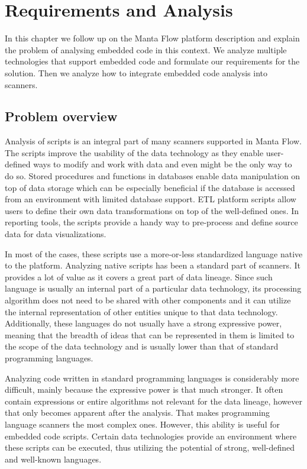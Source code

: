 \chapter{Requirements and Analysis}

In this chapter we follow up on the Manta Flow platform description and explain the problem of analysing embedded code in this context. We analyze multiple technologies that support embedded code and formulate our requirements for the solution. Then we analyze how to integrate embedded code analysis into scanners.

\section{Problem overview}
Analysis of scripts is an integral part of many scanners supported in Manta Flow. The scripts improve the usability of the data technology as they enable user-defined ways to modify and work with data and even might be the only way to do so. Stored procedures and functions in databases enable data manipulation on top of data storage which can be especially beneficial if the database is accessed from an environment with limited database support. ETL platform scripts allow users to define their own data transformations on top of the well-defined ones. In reporting tools, the scripts provide a handy way to pre-process and define source data for data visualizations.
\par %
In most of the cases, these scripts use a more-or-less standardized language native to the platform. Analyzing native scripts has been a standard part of scanners. It provides a lot of value as it covers a great part of data lineage. Since such language is usually an internal part of a particular data technology, its processing algorithm does not need to be shared with other components and it can utilize the internal representation of other entities unique to that data technology. Additionally, these languages do not usually have a strong expressive power, meaning that the breadth of ideas that can be represented in them is limited to the scope of the data technology and is usually  lower than that of standard programming languages.
\par %
Analyzing code written in standard programming languages is considerably more difficult, mainly because the expressive power is that much stronger. It often contain expressions or entire algorithms not relevant for the data lineage, however that only becomes apparent after the analysis. That makes programming language scanners the most complex ones. However, this ability is useful for embedded code scripts. Certain data technologies provide an environment where these scripts can be executed, thus utilizing the potential of strong, well-defined and well-known languages.


